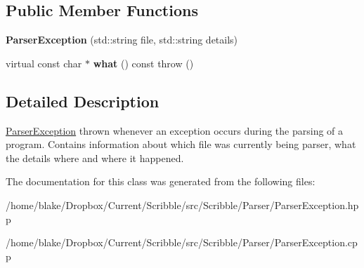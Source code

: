 \subsection*{Public Member Functions}
\begin{DoxyCompactItemize}
\item 
\hypertarget{class_scribble_core_1_1_parser_exception_a7481274fb9f9006cf01dda58ef9953bb}{{\bfseries Parser\-Exception} (std\-::string file, std\-::string details)}\label{class_scribble_core_1_1_parser_exception_a7481274fb9f9006cf01dda58ef9953bb}

\item 
\hypertarget{class_scribble_core_1_1_parser_exception_ad4ba27faad1057694ca0e3d732a1f66e}{virtual const char $\ast$ {\bfseries what} () const   throw ()}\label{class_scribble_core_1_1_parser_exception_ad4ba27faad1057694ca0e3d732a1f66e}

\end{DoxyCompactItemize}


\subsection{Detailed Description}
\hyperlink{class_scribble_core_1_1_parser_exception}{Parser\-Exception} thrown whenever an exception occurs during the parsing of a program. Contains information about which file was currently being parser, what the details where and where it happened. 

The documentation for this class was generated from the following files\-:\begin{DoxyCompactItemize}
\item 
/home/blake/\-Dropbox/\-Current/\-Scribble/src/\-Scribble/\-Parser/Parser\-Exception.\-hpp\item 
/home/blake/\-Dropbox/\-Current/\-Scribble/src/\-Scribble/\-Parser/Parser\-Exception.\-cpp\end{DoxyCompactItemize}
